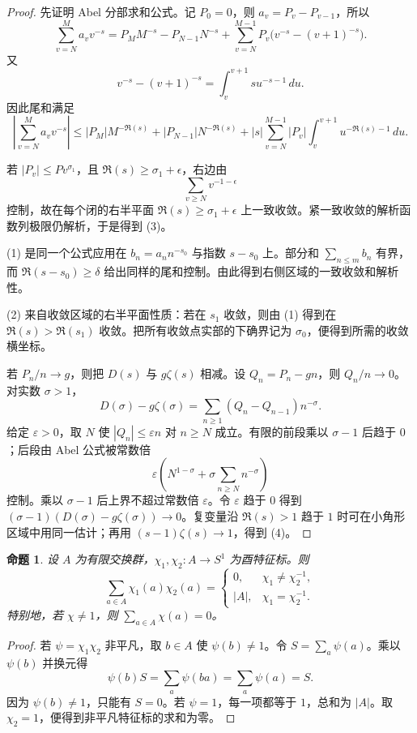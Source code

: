 \documentclass[11pt,a4paper,openany]{ctexbook}
\numberwithin{equation}{chapter}
\theoremstyle{plain}
\newtheorem{proposition}[theorem]{命题}
\theoremstyle{definition}
\theoremstyle{remark}
\begin{document}
\begin{proof}
先证明 Abel 分部求和公式。记 $P_0=0$，则 $a_v=P_v-P_{v-1}$，所以
\[
\sum_{v=N}^{M}a_vv^{-s}
=P_MM^{-s}-P_{N-1}N^{-s}
+\sum_{v=N}^{M-1}P_v\bigl(v^{-s}-(v+1)^{-s}\bigr).
\]
又
\[
v^{-s}-(v+1)^{-s}
=\int_v^{v+1}su^{-s-1}\,du.
\]
因此尾和满足
\[
\left|\sum_{v=N}^{M}a_vv^{-s}\right|
\le |P_M|M^{-\Re(s)}+|P_{N-1}|N^{-\Re(s)}
 +|s|\sum_{v=N}^{M-1}|P_v|\int_v^{v+1}u^{-\Re(s)-1}\,du .
\]

若 $|P_v|\le Pv^{\sigma_1}$，且 $\Re(s)\ge\sigma_1+\epsilon$，右边由
\[
\sum_{v\ge N} v^{-1-\epsilon}
\]
控制，故在每个闭的右半平面 $\Re(s)\ge\sigma_1+\epsilon$ 上一致收敛。紧一致收敛的解析函数列极限仍解析，于是得到 (3)。

(1) 是同一个公式应用在
$b_n=a_nn^{-s_0}$ 与指数 $s-s_0$ 上。部分和 $\sum_{n\le m}b_n$
有界，而 $\Re(s-s_0)\ge\delta$ 给出同样的尾和控制。由此得到右侧区域的一致收敛和解析性。

(2) 来自收敛区域的右半平面性质：若在 $s_1$ 收敛，则由 (1) 得到在
$\Re(s)>\Re(s_1)$ 收敛。把所有收敛点实部的下确界记为 $\sigma_0$，便得到所需的收敛横坐标。

若 $P_n/n\to g$，则把 $D(s)$ 与 $g\zeta(s)$ 相减。设
$Q_n=P_n-gn$，则 $Q_n/n\to0$。对实数 $\sigma>1$，
\[
D(\sigma)-g\zeta(\sigma)
=\sum_{n\ge1}(Q_n-Q_{n-1})n^{-\sigma}.
\]
给定 $\varepsilon>0$，取 $N$ 使 $|Q_n|\le\varepsilon n$ 对 $n\ge N$ 成立。有限的前段乘以
$\sigma-1$ 后趋于 $0$；后段由 Abel 公式被常数倍
\[
\varepsilon\left(N^{1-\sigma}
 +\sigma\sum_{n\ge N}n^{-\sigma}\right)
\]
控制。乘以 $\sigma-1$ 后上界不超过常数倍 $\varepsilon$。令
$\varepsilon$ 趋于 $0$ 得到
$(\sigma-1)(D(\sigma)-g\zeta(\sigma))\to0$。复变量沿
$\Re(s)>1$ 趋于 $1$ 时可在小角形区域中用同一估计；再用
$(s-1)\zeta(s)\to1$，得到 (4)。
\end{proof}

\begin{proposition}
设 $A$ 为有限交换群，$\chi_1,\chi_2:A\to S^1$ 为酉特征标。则
\[
\sum_{a\in A}\chi_1(a)\chi_2(a)=
\begin{cases}
0,&\chi_1\ne\chi_2^{-1},\\
|A|,&\chi_1=\chi_2^{-1}.
\end{cases}
\]
特别地，若 $\chi\ne1$，则 $\sum_{a\in A}\chi(a)=0$。
\end{proposition}

\begin{proof}
若 $\psi=\chi_1\chi_2$ 非平凡，取 $b\in A$ 使 $\psi(b)\ne1$。令 $S=\sum_a\psi(a)$。乘以 $\psi(b)$ 并换元得
\[
\psi(b)S=\sum_a\psi(ba)=\sum_a\psi(a)=S.
\]
因为 $\psi(b)\ne1$，只能有 $S=0$。若 $\psi=1$，每一项都等于
$1$，总和为 $|A|$。取 $\chi_2=1$，便得到非平凡特征标的求和为零。
\end{proof}
\end{document}
